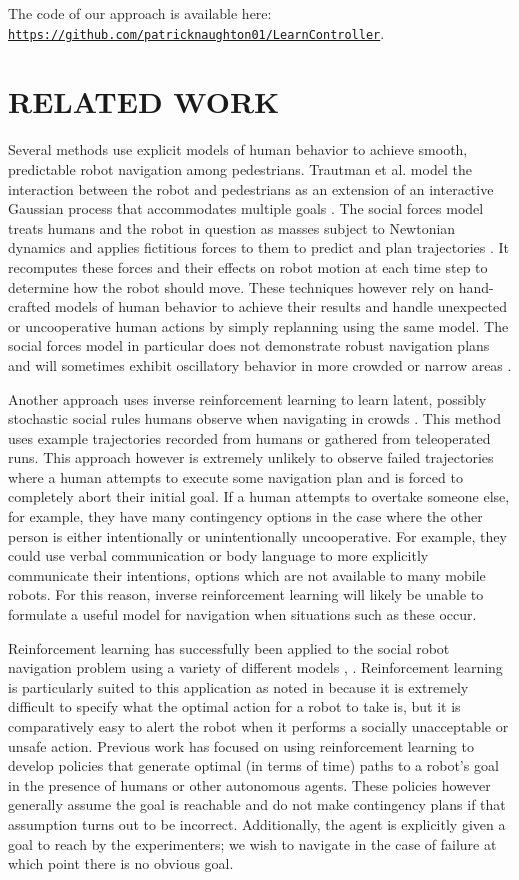 \documentclass[letterpaper, 10 pt, conference]{ieeeconf}  %
\begin{document}
	The code of our approach is available here: \texttt{\url{https://github.com/patricknaughton01/LearnController}}.
	

\section{RELATED WORK}\label{sec:relatedwork}
	Several methods use explicit models of human behavior to achieve smooth, predictable robot navigation among pedestrians. Trautman et al. model the interaction between the robot and pedestrians as an extension of an interactive Gaussian process that accommodates multiple goals \cite{caseforcoop}. The social forces model treats humans and the robot in question as masses subject to Newtonian dynamics and applies fictitious forces to them to predict and plan trajectories \cite{sfm}. It recomputes these forces and their effects on robot motion at each time step to determine how the robot should move. These techniques however rely on hand-crafted models of human behavior to achieve their results and handle unexpected or uncooperative human actions by simply replanning using the same model. The social forces model in particular does not demonstrate robust navigation plans and will sometimes exhibit oscillatory behavior in more crowded or narrow areas \cite{sfm}.
	
	Another approach uses inverse reinforcement learning to learn latent, possibly stochastic social rules humans observe when navigating in crowds \cite{socialirl}. This method uses example trajectories recorded from humans or gathered from teleoperated runs. This approach however is extremely unlikely to observe failed trajectories where a human attempts to execute some navigation plan and is forced to completely abort their initial goal. If a human attempts to overtake someone else, for example, they have many contingency options in the case where the other person is either intentionally or unintentionally uncooperative. For example, they could use verbal communication or body language to more explicitly communicate their intentions, options which are not available to many mobile robots. For this reason, inverse reinforcement learning will likely be unable to formulate a useful model for navigation when situations such as these occur.
	
	Reinforcement learning has successfully been applied to the social robot navigation problem using a variety of different models \cite{sociallyawarerl}, \cite{crowdawarerl}. Reinforcement learning is particularly suited to this application as noted in \cite{sociallyawarerl} because it is extremely difficult to specify what the optimal action for a robot to take is, but it is comparatively easy to alert the robot when it performs a socially unacceptable or unsafe action. Previous work has focused on using reinforcement learning to develop policies that generate optimal (in terms of time) paths to a robot's goal in the presence of humans or other autonomous agents. These policies however generally assume the goal is reachable and do not make contingency plans if that assumption turns out to be incorrect. Additionally, the agent is explicitly given a goal to reach by the experimenters; we wish to navigate in the case of failure at which point there is no obvious goal.
	
\end{document}
